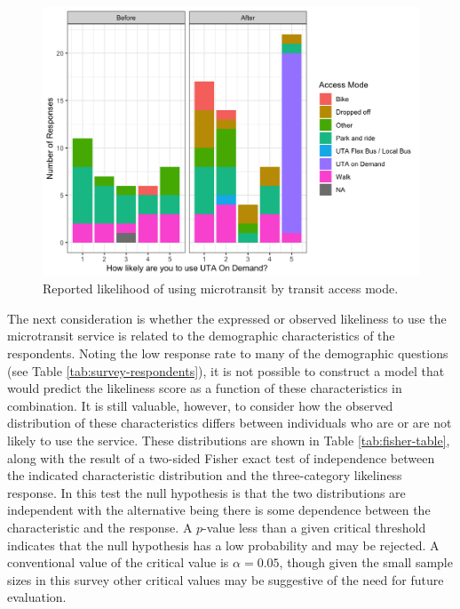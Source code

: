 \documentclass[smartcities,article,submit,moreauthors,pdftex]{Definitions/mdpi}
\begin{document}
\begin{figure}
\includegraphics[width=0.8\linewidth]{likelihood-1} \caption{Reported likelihood of using microtransit by transit access mode.}\label{fig:likelihood}
\end{figure}

The next consideration is whether the expressed or observed likeliness to use the microtransit service is related to the demographic characteristics of the respondents. Noting the low response rate to many of the demographic questions (see Table \ref{tab:survey-respondents}), it is not possible to construct a model that would predict the likeliness score as a function of these characteristics in combination. It is still valuable, however, to consider how the observed distribution of these characteristics differs between individuals who are or are not likely to use the service. These distributions are shown in Table \ref{tab:fisher-table}, along with the result of a two-sided Fisher exact test of independence between the indicated characteristic distribution and the three-category likeliness response. In this test the null hypothesis is that the two distributions are independent with the alternative being there is some dependence between the characteristic and the response. A \(p\)-value less than a given critical threshold indicates that the null hypothesis has a low probability and may be rejected. A conventional value of the critical value is \(\alpha=0.05\), though given the small sample sizes in this survey other critical values may be suggestive of the need for future evaluation.
\end{document}

